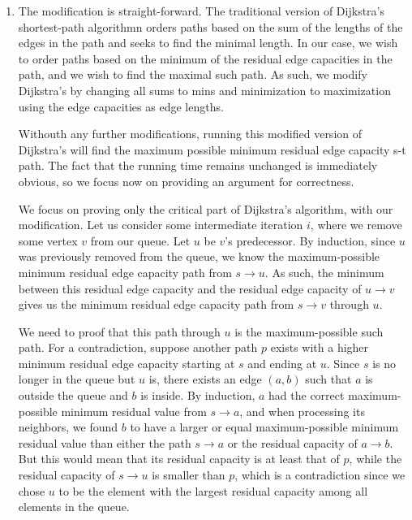 \documentclass[12pt]{exam}
\newcommand{\Q}[1]{\question{\large{\textbf{#1}}}}
\begin{document}
\begin{questions}
\newpage
\Q{Problem 3}
\begin{solution}
  \begin{enumerate}[label=(\alph*)]
    \item
      The modification is straight-forward. The traditional version of Dijkstra's shortest-path algorithmn orders paths based on the sum of the lengths of the edges in the path and seeks to find the minimal length. In our case, we wish to order paths based on the minimum of the residual edge capacities in the path, and we wish to find the maximal such path. As such, we modify Dijkstra's by changing all sums to mins and minimization to maximization using the edge capacities as edge lengths. 

      Withouth any further modifications, running this modified version of Dijkstra's will find the maximum possible minimum residual edge capacity s-t path. The fact that the running time remains unchanged is immediately obvious, so we focus now on providing an argument for correctness.

      We focus on proving only the critical part of Dijkstra's algorithm, with our modification. Let us consider some intermediate iteration $i$, where we remove some vertex $v$ from our queue. Let $u$ be $v$'s predecessor. By induction, since $u$ was previously removed from the queue, we know the maximum-possible minimum residual edge capacity path from $s \to u$. As such, the minimum between this residual edge capacity and the residual edge capacity of $u \to v$ gives us the minimum residual edge capacity path from $s \to v$ through $u$.

      We need to proof that this path through $u$ is the maximum-possible such path. For a contradiction, suppose another path $p$ exists with a higher minimum residual edge capacity starting at $s$ and ending at $u$. Since $s$ is no longer in the queue but $u$ is, there exists an edge $(a,b)$ such that $a$ is outside the queue and $b$ is inside. By induction, $a$ had the correct maximum-possible minimum residual value from $s \to a$, and when processing its neighbors, we found $b$ to have a larger or equal maximum-possible minimum residual value than either the path $s \to a$ or the residual capacity of $a \to b$. But this would mean that its residual capacity is at least that of $p$, while the residual capacity of $s \to u$ is smaller than $p$, which is a contradiction since we chose $u$ to be the element with the largest residual capacity among all elements in the queue.


\end{enumerate}
\end{solution}
\end{questions}
\end{document}
